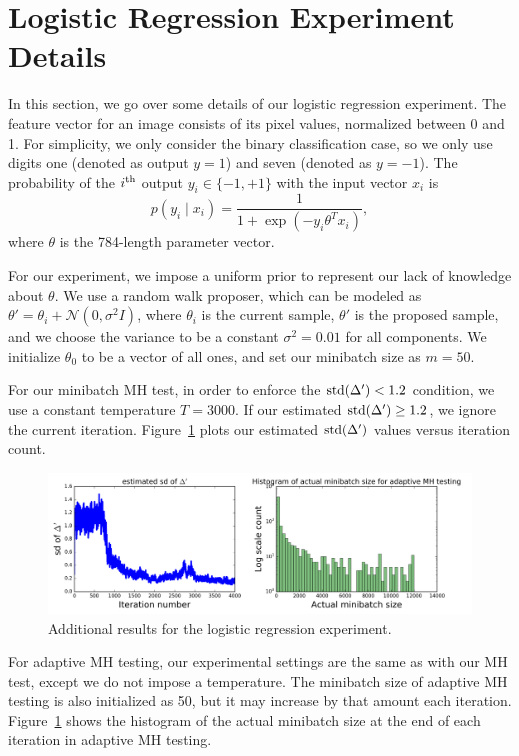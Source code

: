 \documentclass{article}
\begin{document}
\section{Logistic Regression Experiment Details}\label{app:logistic}

In this section, we go over some details of our logistic regression experiment. The feature vector
for an image consists of its pixel values, normalized between 0 and 1. For simplicity, we only
consider the binary classification case, so we only use digits one (denoted as output $y = 1$) and
seven (denoted as $y = -1$). The probability of the $i^{\rm th}$ output $y_i \in \{-1,+1\}$ with the
input vector $x_i$ is
\begin{equation}
p(y_i \mid x_i) = \frac{1}{1+\exp (-y_i \theta^T x_i)},
\end{equation}
where $\theta$ is the 784-length parameter vector.

For our experiment, we impose a uniform prior to represent our lack of knowledge about $\theta$.  We
use a random walk proposer, which can be modeled as $\theta' = \theta_i + \mathcal{N}(0,
\sigma^2I)$, where $\theta_i$ is the current sample, $\theta'$ is the proposed sample, and we choose
the variance to be a constant $\sigma^2 = 0.01$ for all components. We initialize $\theta_0$ to be a
vector of all ones, and set our minibatch size as $m=50$.

For our minibatch MH test, in order to enforce the ${\rm std}(\Delta') < 1.2$ condition, we use a
constant temperature $T = 3000$. If our estimated ${\rm std}(\Delta') \ge 1.2$, we ignore the
current iteration.  Figure~\ref{fig:appendixExp2} plots our estimated ${\rm std}(\Delta')$ values
versus iteration count. 

\begin{figure}[t]
  \centering
  \includegraphics[width=1\linewidth]{./figures/appendixExp2}
  \caption{Additional results for the logistic regression experiment.}
  \label{fig:appendixExp2}
\end{figure}

For adaptive MH testing, our experimental settings are the same as with our MH test, except we do
not impose a temperature. The minibatch size of adaptive MH testing is also initialized as 50, but
it may increase by that amount each iteration. Figure~\ref{fig:appendixExp2} shows the histogram of
the actual minibatch size at the end of each iteration in adaptive MH testing.
\end{document}
